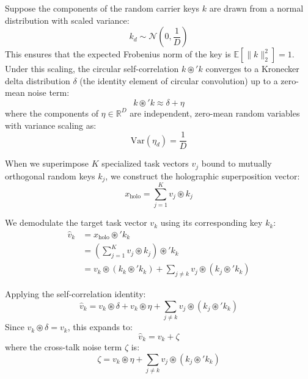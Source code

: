\documentclass{article}
\theoremstyle{plain}
\theoremstyle{definition}
\theoremstyle{remark}
\begin{document}
Suppose the components of the random carrier keys $k$ are drawn from a normal distribution with scaled variance:
\begin{equation}
k_d \sim \mathcal{N}\left( 0, \frac{1}{D} \right)
\end{equation}
This ensures that the expected Frobenius norm of the key is $\mathbb{E}[\|k\|_2^2] = 1$. Under this scaling, the circular self-correlation $k \circledast' k$ converges to a Kronecker delta distribution $\delta$ (the identity element of circular convolution) up to a zero-mean noise term:
\begin{equation}
k \circledast' k \approx \delta + \eta
\end{equation}
where the components of $\eta \in \mathbb{R}^D$ are independent, zero-mean random variables with variance scaling as:
\begin{equation}
\text{Var}(\eta_d) = \frac{1}{D}
\end{equation}

When we superimpose $K$ specialized task vectors $v_j$ bound to mutually orthogonal random keys $k_j$, we construct the holographic superposition vector:
\begin{equation}
x_{\text{holo}} = \sum_{j=1}^K v_j \circledast k_j
\end{equation}

We demodulate the target task vector $v_k$ using its corresponding key $k_k$:
\begin{align}
\hat{v}_k &= x_{\text{holo}} \circledast' k_k \\
&= \left( \sum_{j=1}^K v_j \circledast k_j \right) \circledast' k_k \\
&= v_k \circledast \left( k_k \circledast' k_k \right) + \sum_{j \neq k} v_j \circledast \left( k_j \circledast' k_k \right)
\end{align}

Applying the self-correlation identity:
\begin{equation}
\hat{v}_k = v_k \circledast \delta + v_k \circledast \eta + \sum_{j \neq k} v_j \circledast \left( k_j \circledast' k_k \right)
\end{equation}
Since $v_k \circledast \delta = v_k$, this expands to:
\begin{equation}
\hat{v}_k = v_k + \zeta
\end{equation}
where the cross-talk noise term $\zeta$ is:
\begin{equation}
\zeta = v_k \circledast \eta + \sum_{j \neq k} v_j \circledast \left( k_j \circledast' k_k \right)
\end{equation}
\end{document}
